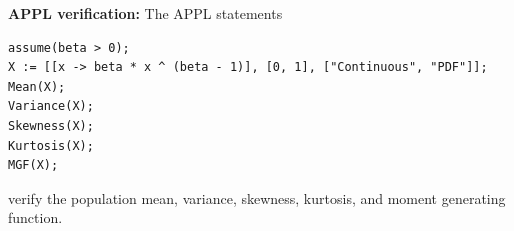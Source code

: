 \documentclass[12pt,fullpage]{article}
\begin{document}

\noindent
{\bf APPL verification:}
The APPL statements
\begin{verbatim}
assume(beta > 0);
X := [[x -> beta * x ^ (beta - 1)], [0, 1], ["Continuous", "PDF"]];
Mean(X);
Variance(X);
Skewness(X);
Kurtosis(X);
MGF(X);
\end{verbatim}
verify the population mean, variance, skewness, kurtosis, and moment generating function.
\end{document}
